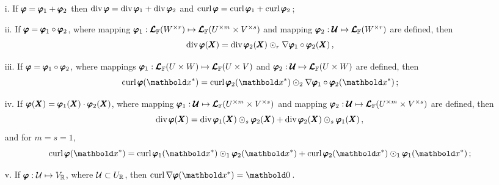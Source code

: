 \begin{itemize}
\setlength\itemsep{.1em}
\item[i.] If $\pmb{\varphi}=\pmb{\varphi}_1+\pmb{\varphi}_2$ then $\operatorname{div}{\pmb{\varphi}}=\operatorname{div}{\pmb{\varphi}_1}+\operatorname{div}{\pmb{\varphi}_2}$ and $\operatorname{curl}{\pmb{\varphi}}=\operatorname{curl}{\pmb{\varphi}_1}+\operatorname{curl}{\pmb{\varphi}_2}\,$;
\item[ii.] If $\pmb{\varphi}=\pmb{\varphi}_1\circ\pmb{\varphi}_2$, where mapping $\pmb{\varphi}_1 : \pmb{\mathcal{L}}_{\mathbb{F}}(W^{\times r}) \mapsto \pmb{\mathcal{L}}_{\mathbb{F}}(U^{\times m}\times V^{\times s})$ and mapping $\pmb{\varphi}_2 : \pmb{\mathcal{U}} \mapsto \pmb{\mathcal{L}}_{\mathbb{F}}(W^{\times r})$ are defined, then
\begin{equation}
\operatorname{div}{\pmb{\varphi}}(\pmb{X}) =\operatorname{div}{\pmb{\varphi}_2}(\pmb{X})\odot_{r}\nabla\pmb{\varphi}_1\circ\pmb{\varphi}_2(\pmb{X})\,,
\end{equation}	
\item[iii.] If $\pmb{\varphi}=\pmb{\varphi}_1\circ\pmb{\varphi}_2$, where mappings $\pmb{\varphi}_1 : \pmb{\mathcal{L}}_{\mathbb{F}}(U\times W) \mapsto \pmb{\mathcal{L}}_{\mathbb{F}}(U\times V)$ and $\pmb{\varphi}_2 : \pmb{\mathcal{U}} \mapsto \pmb{\mathcal{L}}_{\mathbb{F}}(U\times W)$ are defined, then
\begin{equation}
\fua{\crl{\tnr{\varphi}}}{\vto{x}^*} = \fua{\crl{\tnr{\varphi}_2}}{\vto{x}^*}\odot_{2}\fua{\nabla\tnr{{\varphi}}_1\circ\tnr{\varphi}_2}{\vto{x}^*}\,;
\end{equation}	

\item[iv.] If $\pmb{\varphi}(\pmb{X})=\pmb{\varphi}_1(\pmb{X})\cdot\pmb{\varphi}_2(\pmb{X})$, where mapping  $\pmb{\varphi}_1 : \pmb{\mathcal{U}} \mapsto \pmb{\mathcal{L}}_{\mathbb{F}}(U^{\times m}\times V^{\times s})$ and mapping $\pmb{\varphi}_2 : \pmb{\mathcal{U}} \mapsto \pmb{\mathcal{L}}_{\mathbb{F}}(U^{\times m}\times V^{\times s})$ are defined, then
\begin{equation}
\operatorname{div}{\pmb{\varphi}}(\pmb{X}) = \operatorname{div}{\pmb{\varphi}_1}(\pmb{X})\odot_s\pmb{\varphi}_2(\pmb{X})+\operatorname{div}{\pmb{\varphi}_2}(\pmb{X})\odot_s\pmb{\varphi}_1(\pmb{X})\,,
\end{equation}	
and for $m=s=1$,
\begin{equation}
\fua{\crl{\tnr{\varphi}}}{\vto{x}^*} = \fua{\crl{\tnr{\varphi}_1}}{\vto{x}^*}\odot_1\fua{\tnr{\varphi}_2}{\vto{x}^*}+\fua{\crl{\tnr{\varphi}_2}}{\vto{x}^*}\odot_1\fua{\tnr{\varphi}_1}{\vto{x}^*}\,;
\end{equation}

	
\item[v.]	If $\pmb{\varphi} : \mathcal{U} \mapsto V_{\mathbb{R}}$, where $\mathcal{U}\subset U_{\mathbb{R}}$, then $\fua{\crl{\nabla \tnr{\varphi}}}{\vto{x}^*}=\vto{0}\,$.
\end{itemize}

